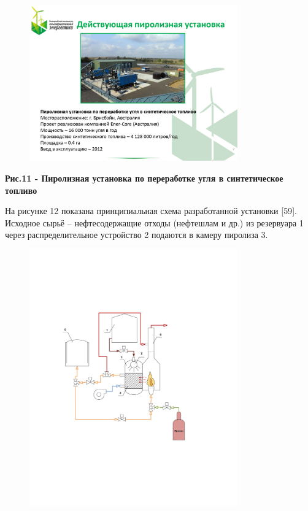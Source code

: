 \begin{figure}[H]
	\centering
	\includegraphics[width=0.8\textwidth]{media/chem2/image74}
	\caption*{}
\end{figure}


{\bfseries Рис.11 - Пиролизная установка по переработке угля в
синтетическое топливо}

На рисунке 12 показана принципиальная схема разработанной установки
{[}59{]}. Исходное сырьё -- нефтесодержащие отходы (нефтешлам и др.) из
резервуара 1 через распределительное устройство 2 подаются в камеру
пиролиза 3.


\begin{figure}[H]
	\centering
	\includegraphics[width=0.8\textwidth]{media/chem2/image75}
	\caption*{}
\end{figure}


